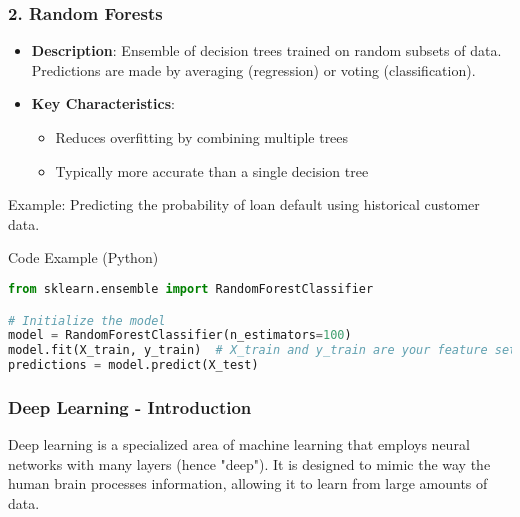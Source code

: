 \documentclass[aspectratio=169]{beamer}
\begin{document}
\begin{frame}[fragile]
    \frametitle{2. Random Forests}
    \begin{itemize}
        \item \textbf{Description}: Ensemble of decision trees trained on random subsets of data. Predictions are made by averaging (regression) or voting (classification).
        \item \textbf{Key Characteristics}:
        \begin{itemize}
            \item Reduces overfitting by combining multiple trees
            \item Typically more accurate than a single decision tree
        \end{itemize}
    \end{itemize}
    Example: Predicting the probability of loan default using historical customer data.

    \begin{block}{Code Example (Python)}
    \begin{lstlisting}[language=Python]
from sklearn.ensemble import RandomForestClassifier

# Initialize the model
model = RandomForestClassifier(n_estimators=100)
model.fit(X_train, y_train)  # X_train and y_train are your feature set and target variable
predictions = model.predict(X_test)
    \end{lstlisting}
    \end{block}
\end{frame}

\begin{frame}[fragile]
    \frametitle{Deep Learning - Introduction}
    Deep learning is a specialized area of machine learning that employs neural networks with many layers (hence "deep"). It is designed to mimic the way the human brain processes information, allowing it to learn from large amounts of data.
\end{frame}
\end{document}
